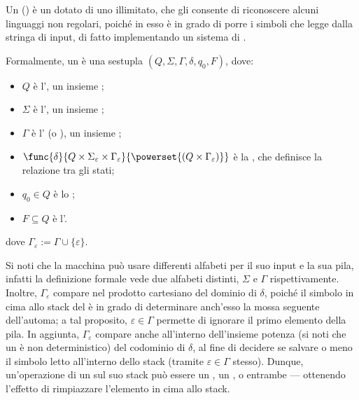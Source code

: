 \documentclass[a4paper, 12pt]{report}
\begin{document}
    \begin{frameddefn}{\PDA}
        Un \tbf{\PDA} () è un \NFA dotato di uno  illimitato, che gli consente di riconoscere alcuni linguaggi non regolari, poiché in esso è in grado di porre i simboli che legge dalla stringa di input, di fatto implementando un sistema di .

        Formalmente, un \PDA è una sestupla $(Q, \Sigma, \Gamma, \delta, q_0, F)$, dove:

        \begin{itemize}
            \item $Q$ è l', un insieme ;
            \item $\Sigma$ è l', un insieme ;
            \item $\Gamma$ è l' (o ), un insieme ;
            \item $\func{\delta}{Q \times \Sigma_\varepsilon \times \Gamma_\varepsilon}{\powerset{(Q \times \Gamma_\varepsilon)}}$ è la , che definisce la relazione tra gli stati;
            \item $q_0 \in Q$ è lo ;
            \item $F \subseteq Q$ è l'.
        \end{itemize}

        dove $\Gamma_\varepsilon := \Gamma \cup \{ \varepsilon \}$.

        Si noti che la macchina può usare differenti alfabeti per il suo input e la sua pila, infatti la definizione formale vede due alfabeti distinti, $\Sigma$ e $\Gamma$ rispettivamente. Inoltre, $\Gamma_\varepsilon$ compare nel prodotto cartesiano del dominio di $\delta$, poiché il simbolo in cima allo stack del \PDA è in grado di determinare anch'esso la mossa seguente dell'automa; a tal proposito, $\varepsilon \in \Gamma$ permette di ignorare il primo elemento della pila. In aggiunta, $\Gamma_\varepsilon$ compare anche all'interno dell'insieme potenza (si noti che un \PDA è non deterministico) del codominio di $\delta$, al fine di decidere se salvare o meno il simbolo letto all'interno dello stack  (tramite $\varepsilon \in \Gamma$ stesso). Dunque, un'operazione di un \PDA sul suo stack può essere un , un , o entrambe  --- ottenendo l'effetto di rimpiazzare l'elemento in cima allo stack.
    \end{frameddefn}
\end{document}
